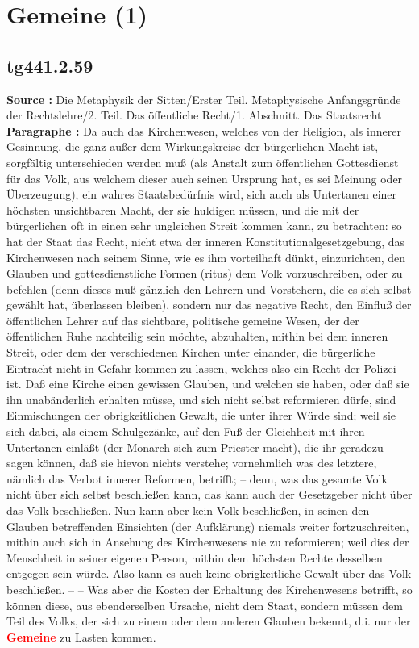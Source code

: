 \documentclass[a4paper,12pt,twoside]{book}
\newcommand{\match}[1]{\textcolor{red}{\textbf{#1}}}
\newcommand{\unnumberedsection}[1]{
	\section*{#1}
	\addcontentsline{toc}{section}{#1}
	\markright{#1}
}
\begin{document}
	\unnumberedsection{Gemeine (1)} 
	\subsection*{tg441.2.59} 
	\textbf{Source : }Die Metaphysik der Sitten/Erster Teil. Metaphysische Anfangsgründe der Rechtslehre/2. Teil. Das öffentliche Recht/1. Abschnitt. Das Staatsrecht\\  
	
	\textbf{Paragraphe : }Da auch das Kirchenwesen, welches von der Religion, als innerer Gesinnung, die ganz außer dem Wirkungskreise der bürgerlichen Macht ist, sorgfältig unterschieden werden muß (als Anstalt zum öffentlichen Gottesdienst für das Volk, aus welchem dieser auch seinen Ursprung hat, es sei Meinung oder Überzeugung), ein wahres Staatsbedürfnis  wird, sich auch als Untertanen einer höchsten unsichtbaren Macht, der sie huldigen müssen, und die mit der bürgerlichen oft in einen sehr ungleichen Streit kommen kann, zu betrachten: so hat der Staat das Recht, nicht etwa der inneren Konstitutionalgesetzgebung, das Kirchenwesen nach seinem Sinne, wie es ihm vorteilhaft dünkt, einzurichten, den Glauben und gottesdienstliche Formen (ritus) dem Volk vorzuschreiben, oder zu befehlen (denn dieses muß gänzlich den Lehrern und Vorstehern, die es sich selbst gewählt hat, überlassen bleiben), sondern nur das negative Recht, den Einfluß der öffentlichen Lehrer auf das sichtbare, politische gemeine Wesen, der der öffentlichen Ruhe nachteilig sein möchte, abzuhalten, mithin bei dem inneren Streit, oder dem der verschiedenen Kirchen unter einander, die bürgerliche Eintracht nicht in Gefahr kommen zu lassen, welches also ein Recht der Polizei ist. Daß eine Kirche einen gewissen Glauben, und welchen sie haben, oder daß sie ihn unabänderlich erhalten müsse, und sich nicht selbst reformieren dürfe, sind Einmischungen der obrigkeitlichen Gewalt, die unter ihrer Würde sind; weil sie sich dabei, als einem Schulgezänke, auf den Fuß der Gleichheit mit ihren Untertanen einläßt (der Monarch sich zum Priester macht), die ihr geradezu sagen können, daß sie hievon nichts verstehe; vornehmlich was des letztere, nämlich das Verbot innerer Reformen, betrifft; – denn, was das gesamte Volk nicht über sich selbst beschließen kann, das kann auch der Gesetzgeber nicht über das Volk beschließen. Nun kann aber kein Volk beschließen, in seinen den Glauben betreffenden Einsichten (der Aufklärung) niemals weiter fortzuschreiten, mithin auch sich in Ansehung des Kirchenwesens nie zu reformieren; weil dies der Menschheit in seiner eigenen Person, mithin dem höchsten Rechte desselben entgegen sein würde. Also kann es auch keine obrigkeitliche Gewalt über das Volk beschließen. – – Was aber die Kosten der Erhaltung des Kirchenwesens betrifft, so können diese, aus ebenderselben Ursache, nicht dem Staat, sondern müssen dem Teil des Volks, der sich zu einem oder dem anderen Glauben bekennt, d.i. nur der \match{Gemeine} zu Lasten kommen. 
	
\end{document}
